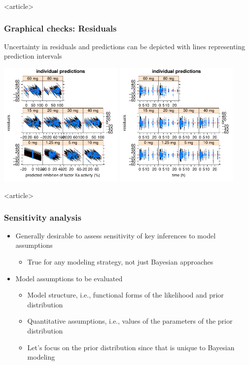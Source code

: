 \documentclass[handout]{beamer}
\begin{document}
\begin{frame}<article>
  \frametitle{Graphical checks: Residuals}
  
    Uncertainty in residuals and predictions can be depicted with lines representing prediction intervals
  \begin{center}
    \includegraphics[width=2.4in,trim=0.2in 0 0
    0,clip]{graphics/me2HandsOn2Plots028.pdf}
    \includegraphics[width=2.4in,trim=0.2in 0 0
    0,clip]{graphics/me2HandsOn2Plots029.pdf}
  \end{center}

\end{frame}

\begin{frame}<article>
  \frametitle{Sensitivity analysis}
  
  \begin{itemize}
  \item Generally desirable to assess sensitivity of key inferences to
    model assumptions
    \begin{itemize}
    \item True for any modeling strategy, not just Bayesian approaches
    \end{itemize}
  \item Model assumptions to be evaluated
    \begin{itemize}
    \item Model structure, i.e., functional forms of the likelihood
      and prior distribution
    \item Quantitative assumptions, i.e., values of the parameters of
      the prior distribution
    \item Let's focus on the prior distribution since that is unique
      to Bayesian modeling
    \end{itemize}
  \end{itemize}

\end{frame}
\end{document}
